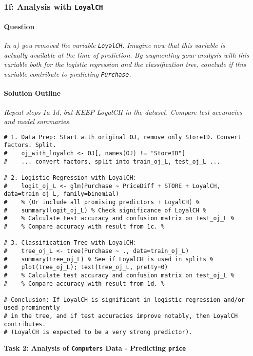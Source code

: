 \documentclass[12pt,a4paper]{article}
\newcommand{\Robject}[1]{\texttt{#1}} %
\newcommand{\Rcode}[1]{\texttt{#1}} %
\begin{document}
    \subsubsection{1f: Analysis with \Rcode{LoyalCH}}
        \paragraph{Question}
        \textit{In a) you removed the variable \Rcode{LoyalCH}. Imagine now that this variable is actually available at the time of prediction. By augmenting your analysis with this variable both for the logistic regression and the classification tree, conclude if this variable contribute to predicting \Rcode{Purchase}.}
        \paragraph{Solution Outline}
        \textit{Repeat steps 1a-1d, but KEEP LoyalCH in the dataset. Compare test accuracies and model summaries.}
\begin{lstlisting}
# 1. Data Prep: Start with original OJ, remove only StoreID. Convert factors. Split.
#    oj_with_loyalch <- OJ[, names(OJ) != "StoreID"]
#    ... convert factors, split into train_oj_L, test_oj_L ...

# 2. Logistic Regression with LoyalCH:
#    logit_oj_L <- glm(Purchase ~ PriceDiff + STORE + LoyalCH, data=train_oj_L, family=binomial)
#    % (Or include all promising predictors + LoyalCH) %
#    summary(logit_oj_L) % Check significance of LoyalCH %
#    % Calculate test accuracy and confusion matrix on test_oj_L %
#    % Compare accuracy with result from 1c. %

# 3. Classification Tree with LoyalCH:
#    tree_oj_L <- tree(Purchase ~ ., data=train_oj_L)
#    summary(tree_oj_L) % See if LoyalCH is used in splits %
#    plot(tree_oj_L); text(tree_oj_L, pretty=0)
#    % Calculate test accuracy and confusion matrix on test_oj_L %
#    % Compare accuracy with result from 1d. %

# Conclusion: If LoyalCH is significant in logistic regression and/or used prominently
# in the tree, and if test accuracies improve notably, then LoyalCH contributes.
# (LoyalCH is expected to be a very strong predictor).
\end{lstlisting}

\vspace{1em}
\textbf{\Large Task 2: Analysis of \Robject{Computers} Data - Predicting \Robject{price}}
\vspace{0.5em}
\end{document}
